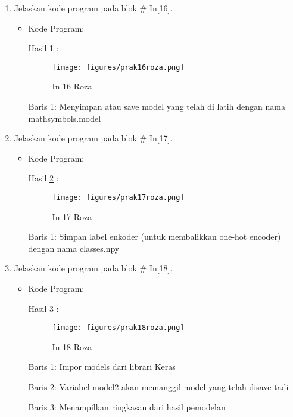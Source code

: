 \begin{enumerate}
\item Jelaskan kode program pada blok \# In[16].
\begin{itemize}
\item Kode Program:

\par Hasil \ref{in16roza} :
\begin{figure}[!hbtp]
\centering
\texttt{[image: figures/prak16roza.png]}
\caption{In 16 Roza}
\label{in16roza}
\end{figure}
\par Baris 1: Menyimpan atau save model yang telah di latih dengan nama mathsymbols.model 
\end{itemize}
\par

\item Jelaskan kode program pada blok \# In[17].
\begin{itemize}
\item Kode Program:

\par Hasil \ref{in17roza} :
\begin{figure}[!hbtp]
\centering
\texttt{[image: figures/prak17roza.png]}
\caption{In 17 Roza}
\label{in17roza}
\end{figure}
\par Baris 1: Simpan label enkoder (untuk membalikkan one-hot encoder) dengan nama classes.npy
\end{itemize}
\par

\item Jelaskan kode program pada blok \# In[18].
\begin{itemize}
\item Kode Program:

\par Hasil \ref{in18roza} :
\begin{figure}[!hbtp]
\centering
\texttt{[image: figures/prak18roza.png]}
\caption{In 18 Roza}
\label{in18roza}
\end{figure}
\par Baris 1: Impor models dari librari Keras
\par Baris 2: Variabel model2 akan memanggil model yang telah disave tadi 
\par Baris 3:  Menampilkan ringkasan dari hasil pemodelan
\end{itemize}
\par



\end{enumerate}
